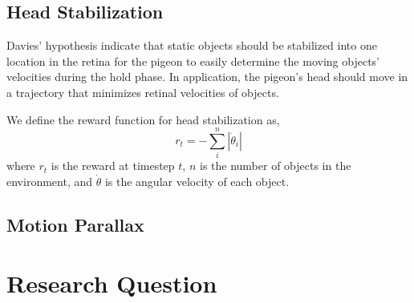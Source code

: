   \subsection{Head Stabilization}
    Davies' hypothesis indicate that static objects should be stabilized into one location in the retina for the pigeon to easily determine the moving objects' velocities during the hold phase. In application, the pigeon's head should move in a trajectory that minimizes retinal velocities of objects.

    We define the reward function for head stabilization as,
    \begin{equation}
      r_t = - \sum_i^n |\dot \theta_i|
    \end{equation}
    where $r_t$ is the reward at timestep $t$, $n$ is the number of objects in the environment, and $\dot \theta$ is the angular velocity of each object.

  \subsection{Motion Parallax}


\section{Research Question}
